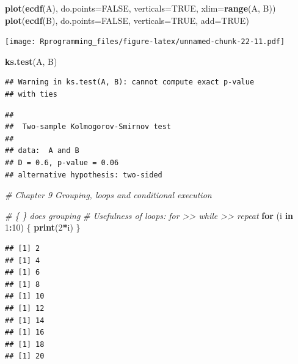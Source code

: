 \documentclass[11pt,]{krantz}
\makeatletter
\newenvironment{Shaded}{\begin{snugshade}}{\end{snugshade}}
\newcommand{\KeywordTok}[1]{\textcolor[rgb]{0.13,0.29,0.53}{\textbf{#1}}}
\newcommand{\DataTypeTok}[1]{\textcolor[rgb]{0.13,0.29,0.53}{#1}}
\newcommand{\DecValTok}[1]{\textcolor[rgb]{0.00,0.00,0.81}{#1}}
\newcommand{\CommentTok}[1]{\textcolor[rgb]{0.56,0.35,0.01}{\textit{#1}}}
\newcommand{\OtherTok}[1]{\textcolor[rgb]{0.56,0.35,0.01}{#1}}
\newcommand{\ControlFlowTok}[1]{\textcolor[rgb]{0.13,0.29,0.53}{\textbf{#1}}}
\newcommand{\OperatorTok}[1]{\textcolor[rgb]{0.81,0.36,0.00}{\textbf{#1}}}
\newcommand{\NormalTok}[1]{#1}
\newenvironment{kframe}{%
\medskip{}
\setlength{\fboxsep}{.8em}
 \def\at@end@of@kframe{}%
 \ifinner\ifhmode%
  \def\at@end@of@kframe{\end{minipage}}%
  \begin{minipage}{\columnwidth}%
 \fi\fi%
 \def\FrameCommand##1{\hskip\@totalleftmargin \hskip-\fboxsep
 \colorbox{shadecolor}{##1}\hskip-\fboxsep
     \hskip-\linewidth \hskip-\@totalleftmargin \hskip\columnwidth}%
 \MakeFramed {\advance\hsize-\width
   \@totalleftmargin\z@ \linewidth\hsize
   \@setminipage}}%
 {\par\unskip\endMakeFramed%
 \at@end@of@kframe}
\renewenvironment{Shaded}{\begin{kframe}}{\end{kframe}}
\theoremstyle{definition}
\theoremstyle{definition}
\theoremstyle{remark}
\makeatother
\begin{document}
\begin{Shaded}
\begin{Highlighting}[]
\KeywordTok{plot}\NormalTok{(}\KeywordTok{ecdf}\NormalTok{(A), }\DataTypeTok{do.points=}\OtherTok{FALSE}\NormalTok{, }\DataTypeTok{verticals=}\OtherTok{TRUE}\NormalTok{, }\DataTypeTok{xlim=}\KeywordTok{range}\NormalTok{(A, B))}
\KeywordTok{plot}\NormalTok{(}\KeywordTok{ecdf}\NormalTok{(B), }\DataTypeTok{do.points=}\OtherTok{FALSE}\NormalTok{, }\DataTypeTok{verticals=}\OtherTok{TRUE}\NormalTok{, }\DataTypeTok{add=}\OtherTok{TRUE}\NormalTok{)}
\end{Highlighting}
\end{Shaded}

\texttt{[image: Rprogramming\_files/figure-latex/unnamed-chunk-22-11.pdf]}

\begin{Shaded}
\begin{Highlighting}[]
\KeywordTok{ks.test}\NormalTok{(A, B)}
\end{Highlighting}
\end{Shaded}

\begin{verbatim}
## Warning in ks.test(A, B): cannot compute exact p-value
## with ties
\end{verbatim}

\begin{verbatim}
## 
##  Two-sample Kolmogorov-Smirnov test
## 
## data:  A and B
## D = 0.6, p-value = 0.06
## alternative hypothesis: two-sided
\end{verbatim}

\begin{Shaded}
\begin{Highlighting}[]
\CommentTok{# Chapter 9 Grouping, loops and conditional execution}

\CommentTok{# \{ \} does grouping}
\CommentTok{# Usefulness of loops: for >> while >> repeat}
\ControlFlowTok{for}\NormalTok{ (i }\ControlFlowTok{in} \DecValTok{1}\OperatorTok{:}\DecValTok{10}\NormalTok{) \{}
  \KeywordTok{print}\NormalTok{(}\DecValTok{2}\OperatorTok{*}\NormalTok{i)}
\NormalTok{\}}
\end{Highlighting}
\end{Shaded}

\begin{verbatim}
## [1] 2
## [1] 4
## [1] 6
## [1] 8
## [1] 10
## [1] 12
## [1] 14
## [1] 16
## [1] 18
## [1] 20
\end{verbatim}
\end{document}
